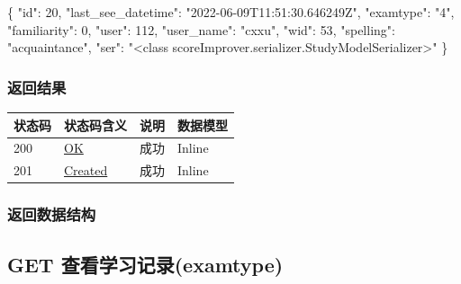 \documentclass[
]{article}
\newenvironment{Shaded}{}{}
\newcommand{\DataTypeTok}[1]{\textcolor[rgb]{0.56,0.13,0.00}{#1}}
\newcommand{\DecValTok}[1]{\textcolor[rgb]{0.25,0.63,0.44}{#1}}
\newcommand{\FunctionTok}[1]{\textcolor[rgb]{0.02,0.16,0.49}{#1}}
\newcommand{\StringTok}[1]{\textcolor[rgb]{0.25,0.44,0.63}{#1}}
\begin{document}
\begin{Shaded}
\begin{Highlighting}[]
\FunctionTok{\{}
  \DataTypeTok{"id"}\FunctionTok{:} \DecValTok{20}\FunctionTok{,}
  \DataTypeTok{"last\_see\_datetime"}\FunctionTok{:} \StringTok{"2022{-}06{-}09T11:51:30.646249Z"}\FunctionTok{,}
  \DataTypeTok{"examtype"}\FunctionTok{:} \StringTok{"4"}\FunctionTok{,}
  \DataTypeTok{"familiarity"}\FunctionTok{:} \DecValTok{0}\FunctionTok{,}
  \DataTypeTok{"user"}\FunctionTok{:} \DecValTok{112}\FunctionTok{,}
  \DataTypeTok{"user\_name"}\FunctionTok{:} \StringTok{"cxxu"}\FunctionTok{,}
  \DataTypeTok{"wid"}\FunctionTok{:} \DecValTok{53}\FunctionTok{,}
  \DataTypeTok{"spelling"}\FunctionTok{:} \StringTok{"acquaintance"}\FunctionTok{,}
  \DataTypeTok{"ser"}\FunctionTok{:} \StringTok{"\textless{}class \textquotesingle{}scoreImprover.serializer.StudyModelSerializer\textquotesingle{}\textgreater{}"}
\FunctionTok{\}}
\end{Highlighting}
\end{Shaded}

\hypertarget{ux8fd4ux56deux7ed3ux679c-11}{%
\subsubsection{返回结果}\label{ux8fd4ux56deux7ed3ux679c-11}}

\begin{longtable}[]{@{}llll@{}}
\toprule
状态码 & 状态码含义 & 说明 & 数据模型 \\
\midrule
\endhead
200 & \href{https://tools.ietf.org/html/rfc7231\#section-6.3.1}{OK} &
成功 & Inline \\
201 & \href{https://tools.ietf.org/html/rfc7231\#section-6.3.2}{Created}
& 成功 & Inline \\
\bottomrule
\end{longtable}

\hypertarget{ux8fd4ux56deux6570ux636eux7ed3ux6784-10}{%
\subsubsection{返回数据结构}\label{ux8fd4ux56deux6570ux636eux7ed3ux6784-10}}

\hypertarget{get-ux67e5ux770bux5b66ux4e60ux8bb0ux5f55examtype}{%
\subsection{GET
查看学习记录(examtype)}\label{get-ux67e5ux770bux5b66ux4e60ux8bb0ux5f55examtype}}
\end{document}
